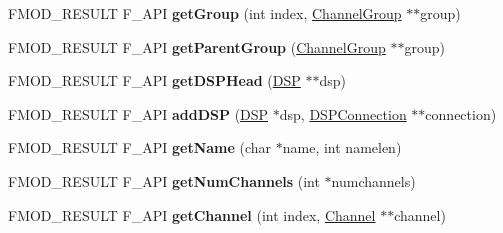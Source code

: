 \begin{DoxyCompactItemize}
\item 
\hypertarget{class_f_m_o_d_1_1_channel_group_a5ac9853233cf3fa367022f1219db26ff}{F\-M\-O\-D\-\_\-\-R\-E\-S\-U\-L\-T F\-\_\-\-A\-P\-I {\bfseries get\-Group} (int index, \hyperlink{class_f_m_o_d_1_1_channel_group}{Channel\-Group} $\ast$$\ast$group)}\label{class_f_m_o_d_1_1_channel_group_a5ac9853233cf3fa367022f1219db26ff}

\item 
\hypertarget{class_f_m_o_d_1_1_channel_group_ab953a5c6bf1dc0d25bed4af7c0653bee}{F\-M\-O\-D\-\_\-\-R\-E\-S\-U\-L\-T F\-\_\-\-A\-P\-I {\bfseries get\-Parent\-Group} (\hyperlink{class_f_m_o_d_1_1_channel_group}{Channel\-Group} $\ast$$\ast$group)}\label{class_f_m_o_d_1_1_channel_group_ab953a5c6bf1dc0d25bed4af7c0653bee}

\item 
\hypertarget{class_f_m_o_d_1_1_channel_group_abe6e293fe4bb90eb1547b0a038c83ac7}{F\-M\-O\-D\-\_\-\-R\-E\-S\-U\-L\-T F\-\_\-\-A\-P\-I {\bfseries get\-D\-S\-P\-Head} (\hyperlink{class_f_m_o_d_1_1_d_s_p}{D\-S\-P} $\ast$$\ast$dsp)}\label{class_f_m_o_d_1_1_channel_group_abe6e293fe4bb90eb1547b0a038c83ac7}

\item 
\hypertarget{class_f_m_o_d_1_1_channel_group_a71b05630f62cd15a889777f29478cda2}{F\-M\-O\-D\-\_\-\-R\-E\-S\-U\-L\-T F\-\_\-\-A\-P\-I {\bfseries add\-D\-S\-P} (\hyperlink{class_f_m_o_d_1_1_d_s_p}{D\-S\-P} $\ast$dsp, \hyperlink{class_f_m_o_d_1_1_d_s_p_connection}{D\-S\-P\-Connection} $\ast$$\ast$connection)}\label{class_f_m_o_d_1_1_channel_group_a71b05630f62cd15a889777f29478cda2}

\item 
\hypertarget{class_f_m_o_d_1_1_channel_group_a152e3dfbbde9a125c002845e8ffd9231}{F\-M\-O\-D\-\_\-\-R\-E\-S\-U\-L\-T F\-\_\-\-A\-P\-I {\bfseries get\-Name} (char $\ast$name, int namelen)}\label{class_f_m_o_d_1_1_channel_group_a152e3dfbbde9a125c002845e8ffd9231}

\item 
\hypertarget{class_f_m_o_d_1_1_channel_group_a31d5e3b8424b09069841b40633dee207}{F\-M\-O\-D\-\_\-\-R\-E\-S\-U\-L\-T F\-\_\-\-A\-P\-I {\bfseries get\-Num\-Channels} (int $\ast$numchannels)}\label{class_f_m_o_d_1_1_channel_group_a31d5e3b8424b09069841b40633dee207}

\item 
\hypertarget{class_f_m_o_d_1_1_channel_group_aadda005170e610a32c03473499b94823}{F\-M\-O\-D\-\_\-\-R\-E\-S\-U\-L\-T F\-\_\-\-A\-P\-I {\bfseries get\-Channel} (int index, \hyperlink{class_f_m_o_d_1_1_channel}{Channel} $\ast$$\ast$channel)}\label{class_f_m_o_d_1_1_channel_group_aadda005170e610a32c03473499b94823}


\end{DoxyCompactItemize}
